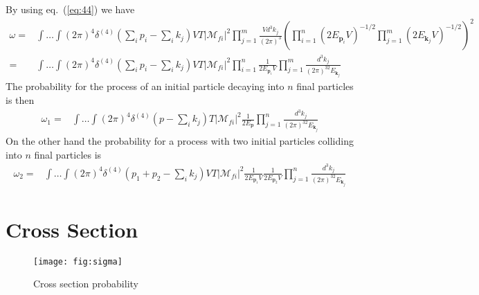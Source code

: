 By using eq.~(\ref{eq:44}) we have
\begin{align}
  \omega=&\int\ldots\int 
(2\pi)^4\delta^{(4)}\left(\sum_i p_i-\sum_i k_j\right)V T 
\left|\mathcal{M}_{fi}\right|^2
\prod_{j=1}^m\frac{Vd^3k_j}{(2\pi)^3}
\left(\prod_{i=1}^{n}\left(2E_{\mathbf{p}_i}V\right)^{-1/2}
\prod_{j=1}^{m}\left(2E_{\mathbf{k}_j}V\right)^{-1/2}\right)^2\nonumber\\
=&\int\ldots\int 
(2\pi)^4\delta^{(4)}\left(\sum_i p_i-\sum_i k_j\right)V T 
\left|\mathcal{M}_{fi}\right|^2
\prod_{i=1}^{n}\frac{1}{2E_{\mathbf{p}_i}V}
\prod_{j=1}^m\frac{d^3k_j}{(2\pi)^32E_{\mathbf{k}_j}}
\end{align}
The probability for the process of an initial particle decaying into $n$ final particles is then
\begin{align}
\label{eq:146}
 \omega_1 =&\int\ldots\int 
(2\pi)^4\delta^{(4)}\left(p-\sum_i k_j\right)T 
\left|\mathcal{M}_{fi}\right|^2
\frac{1}{2E_{\mathbf{p}}}
\prod_{j=1}^n\frac{d^3k_j}{(2\pi)^32E_{\mathbf{k}_j}}
\end{align}
On the other hand the probability for a process with two initial particles colliding into $n$ final particles is
\begin{align}
\label{eq:w2}
 \omega_2 =&\int\ldots\int 
(2\pi)^4\delta^{(4)}\left(p_1+p_2-\sum_i k_j\right)VT 
\left|\mathcal{M}_{fi}\right|^2
\frac{1}{2E_{\mathbf{p}_1}V}\frac{1}{2E_{\mathbf{p}_2}V}
\prod_{j=1}^n\frac{d^3k_j}{(2\pi)^32E_{\mathbf{k}_j}}
\end{align}


\section{Cross Section}
\label{sec:cross-section}

\begin{figure}
  \centering
  \texttt{[image: fig:sigma]}
  \caption{Cross section probability}
  \label{fig:sigma}
\end{figure}


